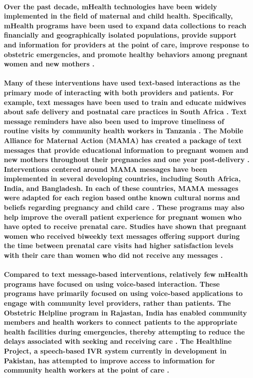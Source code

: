 \paragraph{Over the past decade, mHealth technologies have been widely implemented in the field of maternal and child health. Specifically, mHealth programs have been used to expand data collections to reach financially and geographically isolated populations, provide support and information for providers at the point of care, improve response to obstetric emergencies, and promote healthy behaviors among pregnant women and new mothers \citep{Tamrat2012}.}

\paragraph{Many of these interventions have used text-based interactions as the primary mode of interacting with both providers and patients. For example, text messages have been used to train and educate midwives about safe delivery and postnatal care practices in South Africa \citep{Woods2012}. Text message reminders have also been used to improve timeliness of routine visits by community health workers in Tanzania \citep{DeRenzi2012}. The Mobile Alliance for Maternal Action (MAMA) has created a package of text messages that provide educational information to pregnant women and new mothers throughout their pregnancies and one year post-delivery \citep{MAMA}. Interventions centered around MAMA messages have been implemented in several developing countries, including South Africa, India, and Bangladesh. In each of these countries, MAMA messages were adapted for each region based onthe known cultural norms and beliefs regarding pregnancy and child care \citep{McCartney2012}. These programs may also help improve the overall patient experience for pregnant women who have opted to receive prenatal care. Studies have shown that pregnant women who received biweekly text messages offering support during the time between prenatal care visits had higher satisfaction levels with their care than women who did not receive any messages \citep{Jareethum2008}.}

\paragraph{Compared to text message-based interventions, relatively few mHealth programs have focused on using voice-based interaction. These programs have primarily focused on using voice-based applications to engage with community level providers, rather than patients. The Obstetric Helpline program in Rajastan, India has enabled community members and health workers to connect patients to the appropriate health facilities during emergencies, thereby attempting to reduce the delays associated with seeking and receiving care \citep{UNICEF2008}.  The Healthline Project, a speech-based IVR system currently in development in Pakistan, has attempted to improve access to information for community health workers at the point of care \citep{Sherwani2007}.}

